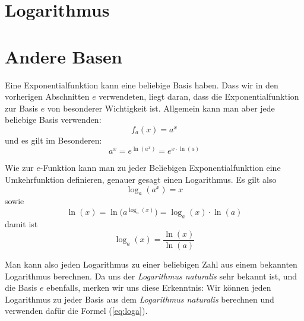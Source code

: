 \section{Logarithmus}



\section{Andere Basen}

Eine Exponentialfunktion kann eine beliebige Basis haben. Dass wir in den vorherigen Abschnitten $e$ verwendeten, liegt daran, dass die Exponentialfunktion zur Basis $e$ von besonderer Wichtigkeit ist. Allgemein kann man aber jede beliebige Basis verwenden:
\begin{equation}
f_a(x) = a^x
\end{equation}
und es gilt im Besonderen:
\begin{equation}\label{eq:ax}
a^x = e^{\ln(a^x)} = e^{x\cdot \ln(a)}
\end{equation}

Wie zur $e$-Funktion kann man zu jeder Beliebigen Exponentialfunktion eine Umkehrfunktion definieren, genauer gesagt einen Logarithmus. Es gilt also
\begin{equation}
\log_a (a^x) = x
\end{equation}
sowie
\begin{equation*}
\ln(x) = \ln\big( a^{\log_a(x)}\big) = \log_a(x) \cdot \ln(a)
\end{equation*}
damit ist
\begin{equation}\label{eq:loga}
\log_a(x) = \frac{\ln(x)}{\ln(a)}
\end{equation}

Man kann also jeden Logarithmus zu einer beliebigen Zahl aus einem bekannten Logarithmus berechnen. Da uns der \emph{Logarithmus naturalis} sehr bekannt ist, und die Basis $e$ ebenfalls, merken wir uns diese Erkenntnis: Wir können jeden Logarithmus zu jeder Basis aus dem \emph{Logarithmus naturalis} berechnen und verwenden dafür die Formel (\ref{eq:loga}).

